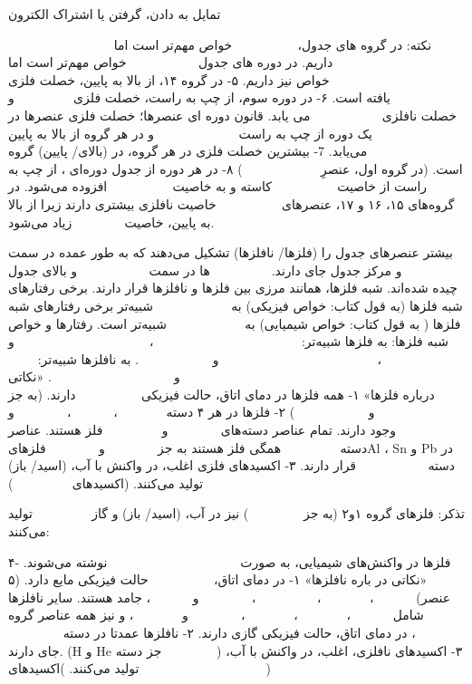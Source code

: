 \documentclass[a4paper,12pt]{article}
\makeatletter
\def\extra{\rule{1ex}{0ex}}
\newcommand\censor{\@ifstar{\@cenmath}{\@centext}}
\newcommand\@cenmath[1]{%
	\protect\rule[-.3ex]{\widthofpbox{\extra$#1$}}{0.1ex}}
\newcommand\@centext[1]{%
	\protect\rule[-.3ex]{\widthofpbox{\extra#1}}{0.1ex}}
\makeatother
\begin{document}
تمایل به دادن، گرفتن یا اشتراک الکترون











نکته: در گروه‌ های جدول،           خواص مهم‌تر است اما                            داریم. در دوره های جدول            خواص مهم‌تر است اما              خواص نیز داریم.
۵- در گروه ۱۴، از بالا به پایین، خصلت فلزی            یافته است.
۶- در دوره سوم، از چپ به راست، خصلت فلزی          و خصلت نافلزی            می یابد.
قانون دوره ای عنصرها؛
خصلت فلزی عنصرها در یک دوره از چپ به راست              و در هر گروه از بالا به پایین                می‌‌یابد.
7- بیشترین خصلت فلزی در هر گروه، در (بالای/ پایین) گروه است. (در گروه اول، عنصرِ             )
۸- در هر دوره از جدول دوره‌ای ، از چپ به راست از خاصیت           کاسته و به خاصیت           افزوده می‌شود.
در گروه‌های ۱۵، ۱۶ و ۱۷، عنصرهای           خاصیت نافلزی بیشتری دارند زیرا از بالا به پایین، خاصیت         زیاد می‌شود.

بیشتر عنصرهای جدول را (فلزها/ نافلزها) تشکیل می‌دهند که به طور عمده در سمت          و مرکز جدول جای دارند.          ها در سمت            و بالای جدول چیده شده‌اند. ‌شبه فلز‌ها، همانند مرزی بین فلزها و نافلز‌ها قرار دارند.
برخی رفتار‌های شبه فلز‌‌ها (به قول کتاب: خواص فیزیکی‌) به             شبیه‌تر
برخی رفتار‌های شبه فلز‌ها ( به قول کتاب: خواص شیمیایی) به             شبیه‌تر است.
رفتار‌ها و خواص شبه فلز‌‌ها:	به فلز‌ها شبیه‌تر:                        ،                      و            ، ‌                         و            .
\censor{نمیدونم} 		به نافلز‌ها شبیه‌تر:                                               و                    .
«نکاتی درباره فلز‌ها»
۱- همه فلز‌ها در دمای اتاق، حالت فیزیکی           دارند. (به جز           و            )
۲- فلز‌ها در هر ۴ دسته        ،       ،         و          وجود دارند. تمام عناصر دسته‌های         و          فلز هستند. عناصر دسته          همگی فلز هستند به جز         و         فلز‌هایAl ، Sn \censor{نمیدونم} و Pb در دسته            قرار دارند.
۳- اکسید‌های فلزی اغلب، در واکنش با آب، (اسید/ باز) تولید می‌کنند. (اکسید‌های          )


تذکر: فلز‌های گروه ۱و۲‌ (به جز         ) نیز در آب، (اسید/ باز) و گاز          تولید می‌کنند:


۴- فلز‌ها در واکنش‌های شیمیایی، به صورت                      نوشته می‌شوند.
«نکاتی در باره نافلز‌ها»
۱- در دمای اتاق،           حالت فیزیکی مایع دارد. (۵ عنصر)       ،        ،          ،         و       ، جامد هستند. سایر نافلز‌ها شامل       ،        ،        ،         و        ، و نیز همه عناصر گروه       ، در دمای اتاق، حالت فیزیکی گازی دارند.
۲- نافلز‌ها عمدتا در دسته          جای دارند. (H و He جز دسته         )
۳- اکسیدهای نافلزی، اغلب، در واکنش با آب،          تولید می‌کنند.
)اکسید‌های            )
\end{document}
